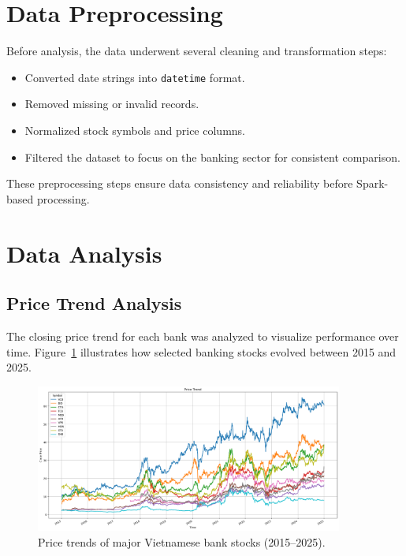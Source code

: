 \documentclass[12pt,a4paper]{article}
\begin{document}
\section{Data Preprocessing}

Before analysis, the data underwent several cleaning and transformation steps:

\begin{itemize}
    \item Converted date strings into \texttt{datetime} format.
    \item Removed missing or invalid records.
    \item Normalized stock symbols and price columns.
    \item Filtered the dataset to focus on the banking sector for consistent comparison.
\end{itemize}

These preprocessing steps ensure data consistency and reliability before Spark-based processing.

\section{Data Analysis}

\subsection{Price Trend Analysis}
The closing price trend for each bank was analyzed to visualize performance over time.  
Figure~\ref{fig:trend} illustrates how selected banking stocks evolved between 2015 and 2025.

\begin{figure}[H]
    \centering
    \includegraphics[width=0.9\textwidth]{price_trend.png}
    \caption{Price trends of major Vietnamese bank stocks (2015–2025).}
    \label{fig:trend}
\end{figure}
\end{document}
